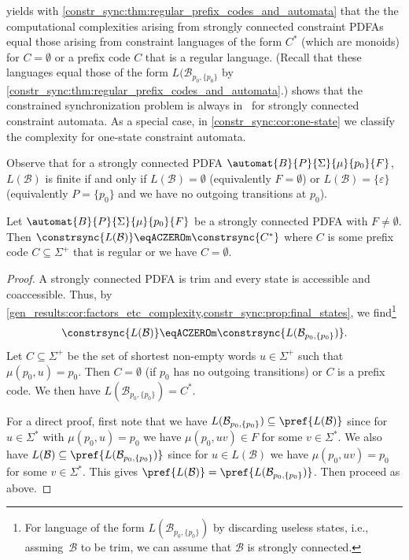 

 yields with \cref{constr_sync:thm:regular_prefix_codes_and_automata}
that the the computational complexities arising from 
strongly connected constraint PDFAs equal those arising
from constraint languages of the form $C^*$ (which are monoids)
for $C=\emptyset$ or a prefix code $C$ that is a regular language. (Recall that these
languages equal those of the form $L(\mathcal B_{p_0, \{p_0\}}$ by \cref{constr_sync:thm:regular_prefix_codes_and_automata}.)
 shows that the constrained synchronization problem is always in \NL\ 
for strongly connected constraint automata. As a special case, in
\cref{constr_sync:cor:one-state} we classify the complexity for one-state constraint automata.

Observe that for a strongly connected PDFA $\automat{B}{P}{\Sigma}{\mu}{p_0}{F}$, $L(\mathcal B)$ is finite if and only
if $L(\mathcal B) = \emptyset$ (equivalently $F = \emptyset$)
or $L(\mathcal B) = \{\varepsilon\}$ (equivalently $P = \{p_0\}$ and we have no 
outgoing transitions at $p_0$).

\begin{theorem} \label{constrsync:thm:SCC-prefix-code}
	Let $\automat{B}{P}{\Sigma}{\mu}{p_0}{F}$ be a strongly connected PDFA with $F \ne \emptyset$.
	Then $\constrsync{L(\mathcal B)} \eqACZEROm \constrsync{C^*}$
	where $C$ is some prefix code $C \subseteq \Sigma^+$
	that is regular or we have  $C = \emptyset$.
\end{theorem}
\begin{proof}
	A strongly connected PDFA is trim and every state is accessible
	and coaccessible. Thus, by \cref{gen_results:cor:factors_etc_complexity,constr_sync:prop:final_states}, 
	we find\footnote{For language of the form $L(\mathcal B_{p_0, \{p_0\}})$
		by discarding useless states, i.e., assming~$\mathcal B$ to be trim,
		we can assume that $\mathcal B$ is strongly connected.}
	\[
	\constrsync{L(\mathcal B)} \eqACZEROm \constrsync{L(\mathcal B_{p_0, \{p_0\}})}.
	\]
	Let $C \subseteq \Sigma^+$ be the set of shortest non-empty
	words $u \in \Sigma^+$ such that $\mu(p_0, u) = p_0$.
	Then $C = \emptyset$ (if $p_0$ has no outgoing transitions)
	or $C$ is a prefix code.
	We then have $L(\mathcal B_{p_0,\{p_0\}}) = C^*$.	
	
	For a direct proof, first note that we have $L(\mathcal B_{p_0,\{p_0\}}) 
	\subseteq \pref{L(\mathcal B)}$
	since for $u \in \Sigma^*$ with $\mu(p_0, u) = p_0$
	we have $\mu(p_0, uv) \in F$
	for some $v \in \Sigma^*$.
	We also have $L(\mathcal B) \subseteq \pref{L(\mathcal B_{p_0,\{p_0\}})}$
	since for $u \in L(\mathcal B)$ we have $\mu(p_0, uv) = p_0$
	for some $v \in \Sigma^*$.
	This gives $\pref{L(\mathcal B)} = \pref{L(\mathcal B_{p_0,\{p_0\}})}$.
	Then proceed as above.
\end{proof}

